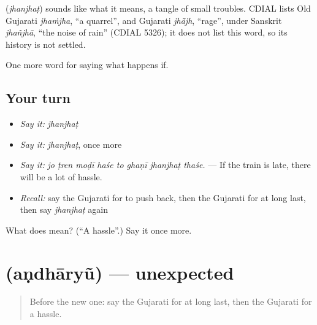 \begin{cousinweb}
\textbf{} (\emph{jhanjhaṭ}) sounds like what it means, a tangle of small troubles. CDIAL lists Old Gujarati \emph{jhaṁjha}, \textquotedblleft{}a quarrel\textquotedblright{}, and Gujarati \emph{jhā̃jh}, \textquotedblleft{}rage\textquotedblright{}, under Sanskrit \emph{jhañjhā}, \textquotedblleft{}the noise of rain\textquotedblright{} (CDIAL 5326); it does not list this word, so its history is not settled.
\end{cousinweb}

\begin{grammarlens}[title={What you've built}]
One more word for saying what happens if.
\end{grammarlens}

\subsection*{Your turn}
\begin{itemize}
\raggedright
  \item \emph{Say it:} \emph{jhanjhaṭ}
  \item \emph{Say it:} \emph{jhanjhaṭ}, once more
  \item \emph{Say it:} \emph{jo ṭren moḍī haśe to ghaṇī jhanjhaṭ thaśe.} — If the train is late, there will be a lot of hassle.
  \item \emph{Recall:} say the Gujarati for to push back, then the Gujarati for at long last, then say \emph{jhanjhaṭ} again
\end{itemize}

\begin{tcolorbox}[breakable,colback=teal!4,colframe=teal!35!black,title={Before you move on}]
What does  mean? (\textquotedblleft{}A hassle\textquotedblright{}.) Say it once more.
\end{tcolorbox}
\section[\texorpdfstring{\gu{અણધાર્યું} (aṇdhāryũ)}{અણધાર્યું (aṇdhāryũ)}]{ (aṇdhāryũ) — unexpected}

\label{lesson:GU-C531-andharyu}



\begin{quote}
Before the new one: say the Gujarati for at long last, then the Gujarati for a hassle.
\end{quote}


